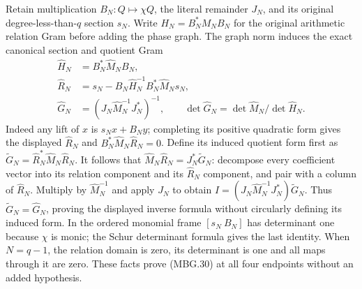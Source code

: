 Retain multiplication \(B_N:Q\mapsto\chi Q\), the literal remainder
\(J_N\), and its original degree-less-than-\(q\) section \(s_N\).
Write \(H_N=B_N^*M_NB_N\) for the original arithmetic relation
Gram before adding the phase graph.
The graph norm induces the exact canonical section and quotient Gram
\[
 \begin{split}
 \widehat H_N&=B_N^*\widehat M_NB_N,\\
 \widehat R_N&=s_N-B_N\widehat H_N^{-1}B_N^*\widehat M_Ns_N,\\
 \widehat G_N&=(J_N\widehat M_N^{-1}J_N^*)^{-1},\qquad
 \det\widehat G_N=\det\widehat M_N/\det\widehat H_N .
 \end{split}
 \tag{MBG.30}\label{GraphV2:eq:mbg-window-Schur}
\]
Indeed any lift of \(x\) is \(s_Nx+B_Ny\); completing its positive
quadratic form gives the displayed \(\widehat R_N\) and
\(B_N^*\widehat M_N\widehat R_N=0\).
Define its induced quotient form first as
\(\widetilde G_N=\widehat R_N^*\widehat M_N\widehat R_N\).
It follows that
\(\widehat M_N\widehat R_N=J_N^*\widetilde G_N\):
decompose every coefficient vector into its relation component and
its \(\widehat R_N\) component, and pair with a column of
\(\widehat R_N\). Multiply by \(\widehat M_N^{-1}\) and apply
\(J_N\) to obtain
\(I=(J_N\widehat M_N^{-1}J_N^*)\widetilde G_N\).
Thus \(\widetilde G_N=\widehat G_N\), proving the displayed inverse
formula without circularly defining its induced form.
In the ordered monomial frame \([s_N\ B_N]\) has determinant one
because \(\chi\) is monic; the Schur determinant formula gives the
last identity. When \(N=q-1\), the relation domain is zero, its
determinant is one and all maps through it are zero. These facts
prove (MBG.30) at all four endpoints without an added hypothesis.

